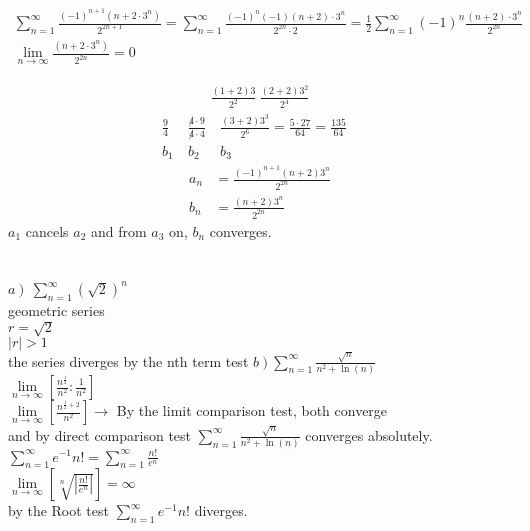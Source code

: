 \documentclass{article}
\begin{document}
\section{}
	\begin{align*}
		\sum\limits_{n=1}^{\infty}\frac{(-1)^{n+1}(n+2\cdot 3^n)}{2^{2n+1}}=\sum\limits_{n=1}^{\infty}{\frac{(-1)^{n}(-1)(n+2)\cdot 3^n}{2^{2n}\cdot 2}}=\frac{1}{2} \sum\limits_{n=1}^{\infty}(-1)^n\frac{(n+2)\cdot 3^n}{2^{2n}}\\
		\lim\limits_{n\rightarrow \infty}\frac{(n+2\cdot 3^{n})}{2^{2n}}=0
	\end{align*}
	\begin{multicols}{2}
		\setlength{\columnseprule}{0.4pt}
		\begin{align*}
			\frac{(1+2)3}{2^2}\ \frac{(2+2)3^2}{2^4}
		\end{align*}
		\begin{align*}
			\frac{9}{4}&\ \frac{\not 4 \cdot 9}{\not 4 \cdot 4}&\ \frac{(3+2)3^3}{2^6}=\frac{5\cdot 27}{64}=\frac{135}{64}& \\
			b_1&\ b_2&\ b_3&
		\end{align*}
		\vfill
		\columnbreak
		\begin{align*}
			a_n&=\frac{\left(-1\right)^{n+1}\left(n+2\right)3^n}{2^{2n}}\\
			b_n&=\frac{\left(n+2\right)3^n}{2^{2n}}
		\end{align*}
		$a_1$ cancels $a_2$ and from $a_3$ on, $b_n$ converges.
	\end{multicols}
	
\section{}
	\begin{multicols}{3}
		\setlength{\columnseprule}{0.4pt}
		$\left.a\right)\ \sum\limits_{n=1}^{\infty}\left(\sqrt{2}\right)^{n}$\\
		geometric series\\
		$r=\sqrt{2}$\\
		$\left|r\right|>1$\\
		the series diverges by the nth term test
		\vfill\columnbreak
		$\left.b\right) \sum\limits_{n=1}^{\infty}\frac{\sqrt{n}}{n^2+\ln{\left(n\right)}}$\\
		$\lim\limits_{n\rightarrow \infty}\left[\frac{n^{\frac{1}{2}}}{n^2} : \frac{1}{n^2}\right]$\\
		$\lim\limits_{n\rightarrow \infty}\left[\frac{n^{\frac{1}{2}+2}}{n^2}\right]\rightarrow$ By the limit comparison test, both converge\\
		and by direct comparison test $\sum\limits_{n=1}^{\infty}{\frac{\sqrt{n}}{n^2+\ln{\left(n\right)}}}$ converges absolutely.
		\vfill\columnbreak
		$\sum\limits_{n=1}^{\infty}{e^{-1}n!}=\sum\limits_{n=1}^{\infty}{\frac{n!}{e^n}}$\\
		$\lim\limits_{n\rightarrow \infty}\left[\sqrt[n]{\left|\frac{n!}{e^n}\right|}\right]=\infty$\\
		by the Root test $\sum\limits_{n=1}^{\infty}{e^{-1}n!}$ diverges.
	\end{multicols}
\end{document}
